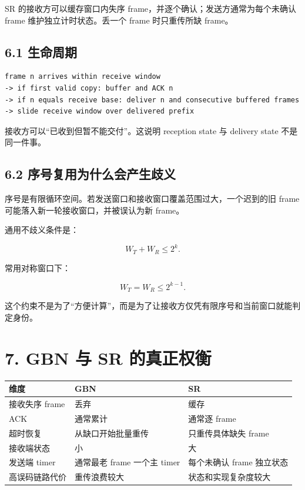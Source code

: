 \documentclass[UTF8,fontset=none,11pt,a4paper]{ctexart}
\begin{document}
SR 的接收方可以缓存窗口内失序 frame，并逐个确认；发送方通常为每个未确认
frame 维护独立计时状态。丢一个 frame 时只重传所缺 frame。

\subsection{6.1 生命周期}\label{61-ux751fux547dux5468ux671f}

\begin{lstlisting}
frame n arrives within receive window
-> if first valid copy: buffer and ACK n
-> if n equals receive base: deliver n and consecutive buffered frames
-> slide receive window over delivered prefix
\end{lstlisting}

接收方可以``已收到但暂不能交付''。这说明 reception state 与 delivery
state 不是同一件事。

\subsection{6.2
序号复用为什么会产生歧义}\label{62-ux5e8fux53f7ux590dux7528ux4e3aux4ec0ux4e48ux4f1aux4ea7ux751fux6b67ux4e49}

序号是有限循环空间。若发送窗口和接收窗口覆盖范围过大，一个迟到的旧 frame
可能落入新一轮接收窗口，并被误认为新 frame。

通用不歧义条件是：

\[
W_T+W_R\le 2^k.
\]

常用对称窗口下：

\[
W_T=W_R\le 2^{k-1}.
\]

这个约束不是为了``方便计算''，而是为了让接收方仅凭有限序号和当前窗口就能判定身份。

\section{7. GBN 与 SR
的真正权衡}\label{7-gbn-ux4e0e-sr-ux7684ux771fux6b63ux6743ux8861}

\begin{longtable}[]{@{}lll@{}}
\toprule\noalign{}
维度 & GBN & SR \\
\midrule\noalign{}
\endhead
\bottomrule\noalign{}
\endlastfoot
接收失序 frame & 丢弃 & 缓存 \\
ACK & 通常累计 & 通常逐 frame \\
超时恢复 & 从缺口开始批量重传 & 只重传具体缺失 frame \\
接收端状态 & 小 & 大 \\
发送端 timer & 通常最老 frame 一个主 timer & 每个未确认 frame
独立状态 \\
高误码链路代价 & 重传浪费较大 & 状态和实现复杂度较大 \\
\end{longtable}
\end{document}
